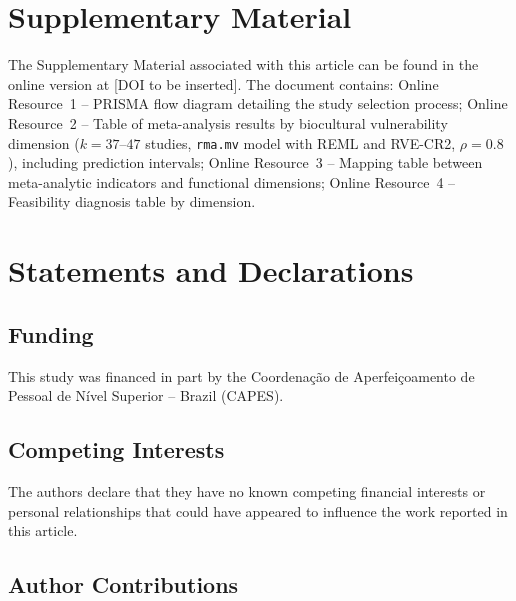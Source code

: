 \documentclass[12pt,a4paper]{article}
\begin{document}
\section*{Supplementary Material}

The Supplementary Material associated with this article can be found in the online version at [DOI to be inserted]. The document contains: Online Resource~1 -- PRISMA flow diagram detailing the study selection process; Online Resource~2 -- Table of meta-analysis results by biocultural vulnerability dimension ($k = 37$--$47$ studies, \texttt{rma.mv} model with REML and RVE-CR2, $\rho = 0.8$), including prediction intervals; Online Resource~3 -- Mapping table between meta-analytic indicators and functional dimensions; Online Resource~4 -- Feasibility diagnosis table by dimension.




\section*{Statements and Declarations}

\subsection*{Funding}

This study was financed in part by the Coordena\c{c}\~ao de Aperfei\c{c}oamento de Pessoal de N\'ivel Superior -- Brazil (CAPES).

\subsection*{Competing Interests}

The authors declare that they have no known competing financial interests or personal relationships that could have appeared to influence the work reported in this article.

\subsection*{Author Contributions}
\end{document}
